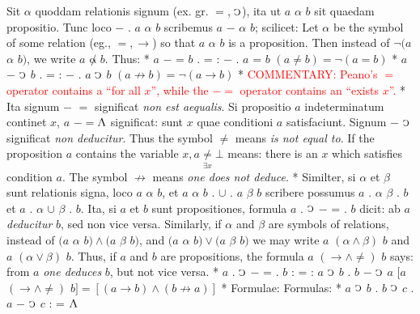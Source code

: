 \documentclass{book}
\newcommand{\C}{\mathop{\sbox0{$\displaystyle$$\reflectbox{C}$} %
\raisebox{-\height+\ht0-0.05cm}[\ht0][\dp0]{\scalebox{0.8}[0.8]{\copy0}}}\displaylimits} %
\newcommand{\abs}{\mathop{\rotatebox[origin=c]{180}{V}}}
\newcommand\commentary[1]{\textcolor{red}{COMMENTARY: #1}}
\newenvironment{translateTwoCol}
               { %
                 \columnratio{0.5, 0.5} \begin{paracol}{2}
                 \newcommand{\LAT}{\switchcolumn[0]*}
                 \newcommand{\ENG}{\switchcolumn[1]}
               }
               { %
                 \let\ENG\undefined
                 \let\LAT\undefined
                 \end{paracol}
               }
\begin{document}
\begin{translateTwoCol}
\quad Sit $\alpha$ quoddam relationis signum (ex. gr. $=$, $\C$), ita ut $a$ $\alpha$ $b$ sit quaedam propositio. Tunc loco $-$ . $a$ $\alpha$ $b$ scribemus $a$ $-$ $\alpha$ $b$; scilicet:
\ENG
\quad Let $\alpha$ be the symbol of some relation (eg., $=, \rightarrow$) so that $a$ $\alpha$ $b$ is a proposition. Then instead of $\neg(a$ $\alpha$ $b)$, we write $a$ $\not\alpha$ $b$. Thus:
\LAT
\hspace{1.06cm} $a$ $-$ = $b$ . = : $-$ . $a$ = $b$
\ENG
\hspace{1.06cm} $(a \not= b) = \neg (a=b)$
\LAT
\hspace{1.06cm} $a$ $-$ $\C$ $b$ . = : $-$ . $a$ $\C$ $b$
\ENG
\hspace{1.06cm} $ (a \not\rightarrow b) = \neg (a \rightarrow b)$
\LAT
\ENG
\commentary{Peano's $=$\scalebox{0.7}{$x$} operator contains a ``for all $x$'', while the $-=$\scalebox{0.7}{$x$} operator contains an ``exists $x$''.}
\LAT
\quad Ita signum $-$ $=$ significat \emph{non est aequalis}. Si propositio $a$ indeterminatum continet $x$, $a$ $-=$\scalebox{0.7}{$x$}\thinspace $\abs$ significat: sunt $x$ quae conditioni $a$ satisfaciunt. Signum $-$ $\C$ significat \emph{non deducitur}.
\ENG
Thus the symbol $\not=$ means \emph{is not equal to}. If the proposition $a$ contains the variable $x, a\underset{\exists x}\neq \bot$ means: there is an $x$ which satisfies condition $a$. The symbol $\not\rightarrow$ means \emph{one does not deduce}.
\LAT
\quad Similter, si $\alpha$ et $\beta$ sunt relationis signa, loco $a$ $\alpha$ $b$, et $a$ $\alpha$ $b$ . $\cup$ . $a$ $\beta$ $b$ scribere possumus $a$ . $\alpha$ $\beta$ . $b$ et $a$ . $\alpha$ $\cup$ $\beta$ . $b$. Ita, si $a$ et $b$ sunt propositiones, formula $a$ . $\C$ $-$ = . $b$ dicit: ab $a$ \emph{deducitur} $b$, sed non vice versa.
\ENG
\quad Similarly, if $\alpha$ and $\beta$ are symbols of relations, instead of $(a$ $\alpha$ $b) \wedge (a$ $\beta$ $b)$, and $(a$ $\alpha$ $b) \vee (a$ $\beta$ $b)$ we may write $a$ $(\alpha \wedge \beta)$ $b$ and $a$ $(\alpha \vee \beta)$ $b$. Thus, if $a$ and $b$ are propositions, the formula $a$ $(\rightarrow \wedge \not=)$ $b$ says: from $a$ \emph{one deduces} $b$, but not vice versa.
\LAT
\hspace{1.06cm} $a$ . $\C$ $-$ = . $b$ : = : $a$ $\C$ $b$ . $b$ $-$ $\C$ $a$
\ENG
\hspace{1.06cm} $[a$ $(\rightarrow \wedge \not=)$ $b] = [(a \rightarrow b) \wedge (b \not\rightarrow a)]$
\LAT
\quad Formulae:
\ENG
\quad Formulas:
\LAT
\hspace{1.06cm} $a$ $\C$ $b$ . $b$ $\C$ $c$ . $a$ $-$ $\C$ $c$ : = $\abs$

\end{translateTwoCol}
\end{document}
